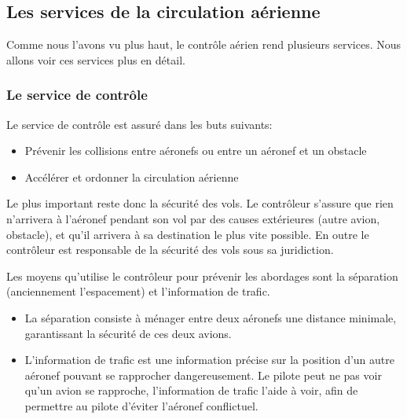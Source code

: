     \subsection{Les services de la circulation aérienne\label{servicesaerien}}
Comme nous l'avons vu plus haut, le contrôle aérien rend plusieurs services. Nous allons voir ces services plus en détail.

        \subsubsection{Le service de contrôle}
Le service de contrôle est assuré dans les buts suivants:
\begin{itemize}
    \item Prévenir les collisions entre aéronefs ou entre un aéronef et un obstacle
    \item Accélérer et ordonner la circulation aérienne
\end{itemize}\medskip

Le plus important reste donc la sécurité des vols. Le contrôleur s'assure que rien n'arrivera à l'aéronef pendant son vol par des causes extérieures (autre avion, obstacle), et qu'il arrivera à sa destination le plus vite possible. En outre le contrôleur est responsable de la sécurité des vols sous sa juridiction.

Les moyens qu'utilise le contrôleur pour prévenir les abordages sont la séparation (anciennement l'espacement) et l'information de trafic.
\begin{itemize}
    \item La séparation consiste à ménager entre deux aéronefs une distance minimale, garantissant la sécurité de ces deux avions.
    \item L'information de trafic est une information précise sur la position d'un autre aéronef pouvant se rapprocher dangereusement. Le pilote peut ne pas voir qu'un avion se rapproche, l'information de trafic l'aide à voir, afin de permettre au pilote d'éviter l'aéronef conflictuel.
\end{itemize}\medskip

